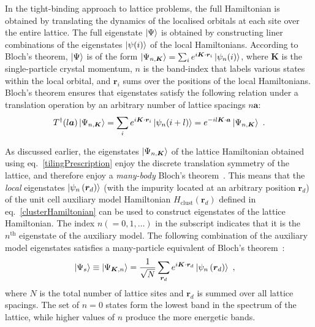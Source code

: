 In the tight-binding approach to lattice problems, the full Hamiltonian is obtained by translating the dynamics of the localised orbitals at each site over the entire lattice. The full eigenstate \(\ket{\Psi}\) is obtained by constructing liner combinations of the eigenstates \(\ket{\psi(i)}\) of the local Hamiltonians. According to Bloch's theorem, \(\ket{\Psi}\) is of the form \(\ket{\Psi_{n,\bm K}} = \sum_{i} e^{i {\bm K}\cdot{\bm r}_i} \ket{\psi_n(i)}\), where \({\bm K}\) is the single-particle crystal momentum, \(n\) is the band-index that labels various states within the local orbital, and \({\bm r}_i\) sums over the positions of the local Hamiltonians. Bloch's theorem ensures that eigenstates satisfy the following relation under a translation operation by an arbitrary number of lattice spacings \({n\bm a}\):
\begin{equation}\begin{aligned}
	T^\dagger(l{\bm a})\ket{\Psi_{n,{\bm K}}} = \sum_{i} e^{i {\bm K}\cdot{\bm r}_i} \ket{\psi_n(i + l)} = e^{-il{\bm K}\cdot{\bm a}}\ket{\Psi_{n,\bm K}}~.
\end{aligned}\end{equation}

As discussed earlier, the eigenstates \(\ket{\Psi_{n,\bm K}}\) of the lattice Hamiltonian obtained using eq.~\ref{tilingPrescription} enjoy the discrete translation symmetry of the lattice, and therefore enjoy a {\it many-body} Bloch's theorem~\cite{Calais_1995,stoyanova}. This means that the {\it local} eigenstates \(\ket{\psi_n\left({\bm r}_d\right)}\) (with the impurity located at an arbitrary position \({\bm r}_d\)) of the unit cell auxiliary model Hamiltonian \({H}_\text{clust}({\bm r}_d)\) defined in eq.~\ref{clusterHamiltonian} can be used to construct eigenstates of the lattice Hamiltonian. The index \(n(=0,1,\ldots)\) in the subscript indicates that it is the \(n^\text{th}\) eigenstate of the auxiliary model. The following combination of the auxiliary model eigenstates satisfies a many-particle equivalent of Bloch's theorem~\cite{Calais_1995,stoyanova}:
\begin{equation}\begin{aligned}\label{eigenstateProposal}
	\ket{\Psi_{s}} \equiv \ket{\Psi_{{\bm K}, n}} &= \frac{1}{\sqrt N}\sum_{{\bm r}_d} e^{i {\bm K}\cdot{\bm r}_d} \ket{\psi_{n}\left({\bm r}_d\right)}~,
\end{aligned}\end{equation}
where \(N\) is the total number of lattice sites and \({\bm r}_d\) is summed over all lattice spacings. The set of \(n=0\) states form the lowest band in the spectrum of the lattice, while higher values of \(n\) produce the more energetic bands.

